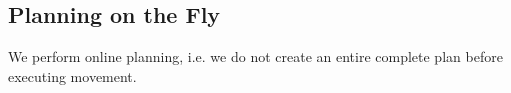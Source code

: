 \subsection{Planning on the Fly}

We perform online planning, i.e. we do not create an entire complete plan before executing movement.
